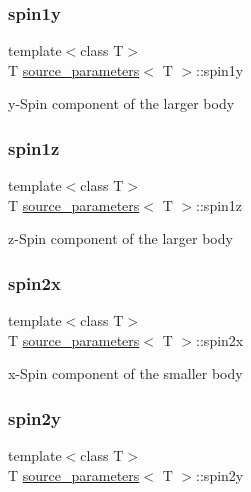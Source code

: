 \subsubsection{\texorpdfstring{spin1y}{spin1y}}
{\footnotesize\ttfamily template$<$class T$>$ \\
T \hyperlink{structsource__parameters}{source\+\_\+parameters}$<$ T $>$\+::spin1y}

y-\/\+Spin component of the larger body \mbox{\label{structsource__parameters_a4184da329b8db0612133d4202f5f2769}} 
\subsubsection{\texorpdfstring{spin1z}{spin1z}}
{\footnotesize\ttfamily template$<$class T$>$ \\
T \hyperlink{structsource__parameters}{source\+\_\+parameters}$<$ T $>$\+::spin1z}

z-\/\+Spin component of the larger body \mbox{\label{structsource__parameters_ac5278ad7984fb12f6a0c0277d6c6f25e}} 
\subsubsection{\texorpdfstring{spin2x}{spin2x}}
{\footnotesize\ttfamily template$<$class T$>$ \\
T \hyperlink{structsource__parameters}{source\+\_\+parameters}$<$ T $>$\+::spin2x}

x-\/\+Spin component of the smaller body \mbox{\label{structsource__parameters_a7f457ff3d231ba2f254570a7e09f45f9}} 
\subsubsection{\texorpdfstring{spin2y}{spin2y}}
{\footnotesize\ttfamily template$<$class T$>$ \\
T \hyperlink{structsource__parameters}{source\+\_\+parameters}$<$ T $>$\+::spin2y}

